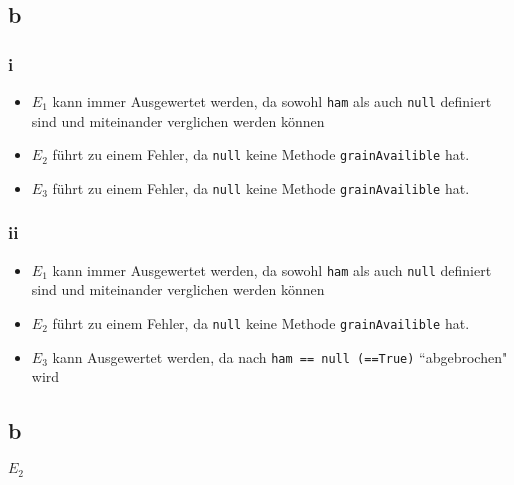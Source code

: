 \documentclass{article}
\begin{document}
\subsection*{b}
\subsubsection*{i}
\begin{itemize}
    \item { $E_1$ kann immer Ausgewertet werden, da sowohl 
    \verb|ham| als auch \verb|null| definiert sind und
    miteinander verglichen werden können }
    \item { $E_2$ führt zu einem Fehler, da \verb|null| keine
    Methode \verb|grainAvailible| hat.}
    \item { $E_3$ führt zu einem Fehler, da \verb|null| keine
    Methode \verb|grainAvailible| hat.}
\end{itemize}
\subsubsection*{ii}
\begin{itemize}
    \item { $E_1$ kann immer Ausgewertet werden, da sowohl 
    \verb|ham| als auch \verb|null| definiert sind und
    miteinander verglichen werden können }
    \item { $E_2$ führt zu einem Fehler, da \verb|null| keine
    Methode \verb|grainAvailible| hat.}
    \item{ $E_3$ kann Ausgewertet werden, da nach
    \verb|ham == null (==True)| ``abgebrochen" wird}
\end{itemize}
\subsection*{b}
$E_2$ 
\end{document}
